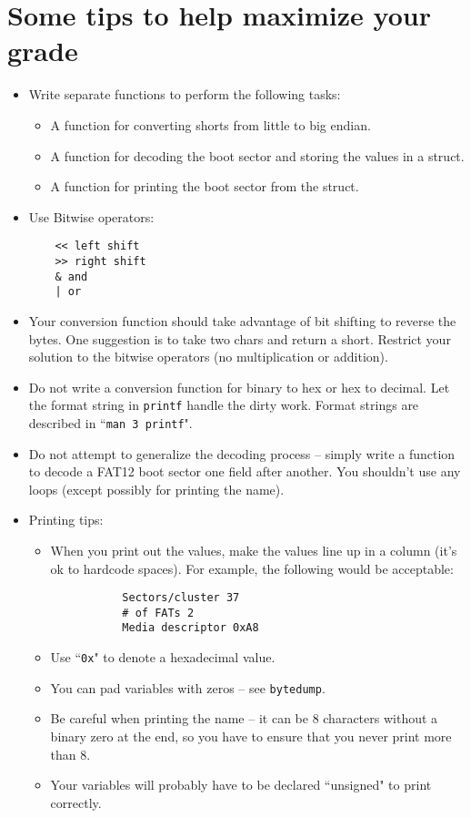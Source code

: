 \documentclass[letterpaper,10pt]{article}
\begin{document}
\section{Some tips to help maximize your grade}
\begin{itemize}
\item Write separate functions to perform the following tasks:
    \begin{itemize}
    \item A function for converting shorts from little to big endian.
    \item A function for decoding the boot sector and storing the values in a struct.
    \item A function for printing the boot sector from the struct.
    \end{itemize}
\item Use Bitwise operators:
    \begin{verbatim}
    << left shift
    >> right shift
    & and
    | or
    \end{verbatim}
\item Your conversion function should take advantage of bit shifting to reverse the bytes. One
suggestion is to take two chars and return a short. Restrict your solution to the bitwise
operators (no multiplication or addition).
\item Do not write a conversion function for binary to hex or hex to decimal. Let the format
string in \verb=printf= handle the dirty work. Format strings are described in ``\verb+man 3 printf+".

\item Do not attempt to generalize the decoding process – simply write a function to decode a
FAT12 boot sector one field after another. You shouldn’t use any loops (except possibly
for printing the name).

\item Printing tips:
    \begin{itemize}
    \item When you print out the values, make the values line up in a column (it’s ok to
        hardcode spaces). For example, the following would be acceptable:
        \begin{verbatim}
           Sectors/cluster 37
           # of FATs 2
           Media descriptor 0xA8
       \end{verbatim}
    \item Use ``\verb+0x+" to denote a hexadecimal value.
    \item You can pad variables with zeros – see \verb+bytedump+.
    \item Be careful when printing the name – it can be 8 characters without a binary zero at
        the end, so you have to ensure that you never print more than 8.
    \item Your variables will probably have to be declared ``unsigned" to print correctly.
    \end{itemize}


\end{itemize}
\end{document}
